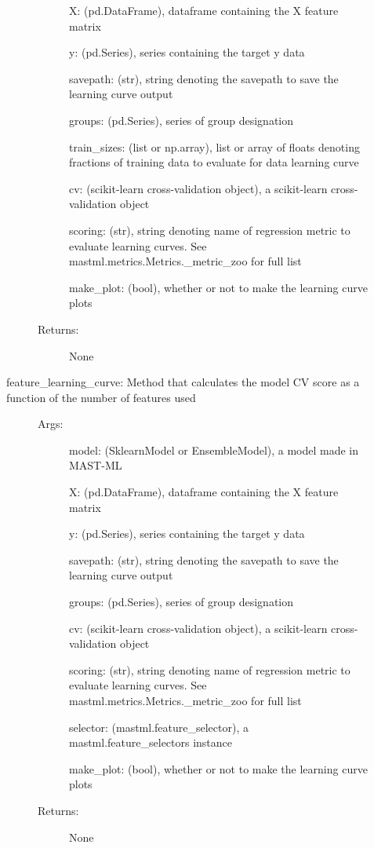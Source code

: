 \documentclass[letterpaper,10pt,english]{sphinxmanual}
\begin{document}
\begin{fulllineitems}
\begin{description}
\begin{description}
\begin{description}
X: (pd.DataFrame), dataframe containing the X feature matrix

y: (pd.Series), series containing the target y data

savepath: (str), string denoting the savepath to save the learning curve output

groups: (pd.Series), series of group designation

train\_sizes: (list or np.array), list or array of floats denoting fractions of training data to evaluate for data learning curve

cv: (scikit-learn cross-validation object), a scikit-learn cross-validation object

scoring: (str), string denoting name of regression metric to evaluate learning curves. See mastml.metrics.Metrics.\_metric\_zoo for full list

make\_plot: (bool), whether or not to make the learning curve plots

\item[{Returns:}] \leavevmode
None

\end{description}

\item[{feature\_learning\_curve: Method that calculates the model CV score as a function of the number of features used}] \leavevmode\begin{description}
\item[{Args:}] \leavevmode
model: (SklearnModel or EnsembleModel), a model made in MAST-ML

X: (pd.DataFrame), dataframe containing the X feature matrix

y: (pd.Series), series containing the target y data

savepath: (str), string denoting the savepath to save the learning curve output

groups: (pd.Series), series of group designation

cv: (scikit-learn cross-validation object), a scikit-learn cross-validation object

scoring: (str), string denoting name of regression metric to evaluate learning curves. See mastml.metrics.Metrics.\_metric\_zoo for full list

selector: (mastml.feature\_selector), a mastml.feature\_selectors instance

make\_plot: (bool), whether or not to make the learning curve plots

\item[{Returns:}] \leavevmode
None


\end{description}
\end{description}
\end{description}
\end{fulllineitems}
\end{document}
